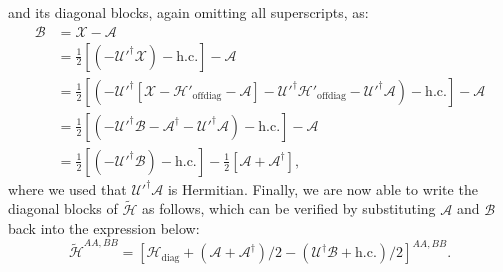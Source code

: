 %
and its diagonal blocks, again omitting all superscripts, as:
%
\begin{align*}
  \mathcal{B} &= \mathcal{X} - \mathcal{A} \\
  &= \frac{1}{2}\left[(-\mathcal{U}'^\dagger \mathcal{X})- \textrm{h.c.}\right] - \mathcal{A} \\
  &= \frac{1}{2}\left[(-\mathcal{U}'^\dagger \left[\mathcal{X} - \mathcal{H}'_\textrm{offdiag} - \mathcal{A}\right] - \mathcal{U}'^\dagger \mathcal{H}'_\textrm{offdiag} - \mathcal{U}'^\dagger \mathcal{A})- \textrm{h.c.}\right] - \mathcal{A} \\
  &= \frac{1}{2}\left[(-\mathcal{U}'^\dagger \mathcal{B} - \mathcal{A}^\dagger - \mathcal{U}'^\dagger \mathcal{A})- \textrm{h.c.}\right] - \mathcal{A} \\
  &= \frac{1}{2}\left[(-\mathcal{U}'^\dagger \mathcal{B})- \textrm{h.c.}\right] - \frac{1}{2}\left[\mathcal{A} + \mathcal{A}^\dagger \right],
\end{align*}
%
where we used that $\mathcal{U}'^\dagger \mathcal{A}$ is Hermitian.
%
Finally, we are now able to write the diagonal blocks of $\tilde{\mathcal{H}}$ as follows, which can be verified by substituting $\mathcal{A}$ and $\mathcal{B}$ back into the expression below:
%
\begin{equation}
\label{eq:H_tilde_optimized}
\tilde{\mathcal{H}}^{AA,BB} = \left[\mathcal{H}_\textrm{diag} + (\mathcal{A} + \mathcal{A}^\dagger)/2 -(\mathcal{U}^\dagger \mathcal{B} + \textrm{h.c.})/2\right]^{AA,BB}.
\end{equation}
